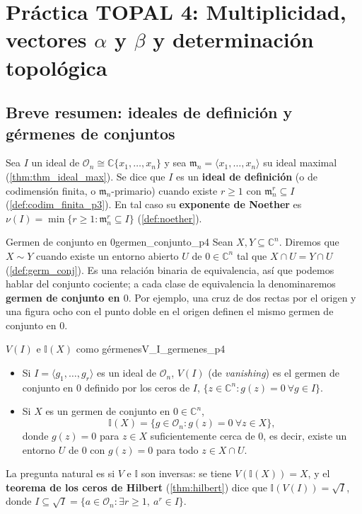 \documentclass[11pt,a4paper]{article}
\begin{document}
\section{Práctica TOPAL 4: Multiplicidad, vectores $\alpha$ y $\beta$ y determinación topológica}
\label{sec:p4}

\subsection*{Breve resumen: ideales de definición y gérmenes de conjuntos}

Sea $I$ un ideal de $\mathcal{O}_n \cong \mathbb{C}\{x_1, \dots, x_n\}$ y sea $\mathfrak{m}_n = \langle x_1, \dots, x_n \rangle$ su ideal maximal (\cref{thm:thm_ideal_max}). Se dice que $I$ es un \textbf{ideal de definición} (o de codimensión finita, o $\mathfrak{m}_n$-primario) cuando existe $r \geq 1$ con $\mathfrak{m}_n^r \subseteq I$ (\cref{def:codim_finita_p3}). En tal caso su \textbf{exponente de Noether} es $\nu(I) = \min\{ r \geq 1 : \mathfrak{m}_n^r \subseteq I \}$ (\cref{def:noether}).

\begin{definicion}{Germen de conjunto en $0$}{germen_conjunto_p4}
Sean $X, Y \subseteq \mathbb{C}^n$. Diremos que $X \sim Y$ cuando existe un entorno abierto $U$ de $0 \in \mathbb{C}^n$ tal que $X \cap U = Y \cap U$ (\cref{def:germ_conj}). Es una relación binaria de equivalencia, así que podemos hablar del conjunto cociente; a cada clase de equivalencia la denominaremos \textbf{germen de conjunto en $0$}. Por ejemplo, una cruz de dos rectas por el origen y una figura ocho con el punto doble en el origen definen el mismo germen de conjunto en $0$.
\end{definicion}

\begin{definicion}{$V(I)$ e $\mathbb{I}(X)$ como gérmenes}{V_I_germenes_p4}
\begin{itemize}
    \item Si $I = \langle g_1, \dots, g_r \rangle$ es un ideal de $\mathcal{O}_n$, $V(I)$ (de \emph{vanishing}) es el germen de conjunto en $0$ definido por los ceros de $I$, $\{ z \in \mathbb{C}^n : g(z) = 0\ \forall g \in I \}$.
    \item Si $X$ es un germen de conjunto en $0 \in \mathbb{C}^n$,
    \[ \mathbb{I}(X) = \{ g \in \mathcal{O}_n : g(z) = 0 \ \forall z \in X \}, \]
    donde $g(z) = 0$ para $z \in X$ suficientemente cerca de $0$, es decir, existe un entorno $U$ de $0$ con $g(z) = 0$ para todo $z \in X \cap U$.
\end{itemize}
La pregunta natural es si $V$ e $\mathbb{I}$ son inversas: se tiene $V(\mathbb{I}(X)) = X$, y el \textbf{teorema de los ceros de Hilbert} (\cref{thm:hilbert}) dice que $\mathbb{I}(V(I)) = \sqrt{I}$, donde $I \subseteq \sqrt{I} = \{ a \in \mathcal{O}_n : \exists r \geq 1,\ a^r \in I \}$.
\end{definicion}
\end{document}
